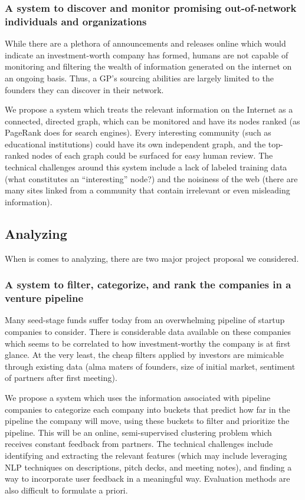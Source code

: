 \subsubsection{A system to discover and monitor promising out-of-network individuals and organizations}

While there are a plethora of announcements and releases online which would indicate an investment-worth company has formed, humans are not capable of monitoring and filtering the wealth of information generated on the internet on an ongoing basis. Thus, a GP's sourcing abilities are largely limited to the founders they can discover in their network.

We propose a system which treats the relevant information on the Internet as a connected, directed graph, which can be monitored and have its nodes ranked (as PageRank does for search engines). Every interesting community (such as educational institutions) could have its own independent graph, and the top-ranked nodes of each graph could be surfaced for easy human review. The technical challenges around this system include a lack of labeled training data (what constitutes an ``interesting'' node?) and the noisiness of the web (there are many sites linked from a community that contain irrelevant or even misleading information).

\subsection{Analyzing}

When is comes to analyzing, there are two major project proposal we considered.

\subsubsection{A system to filter, categorize, and rank the companies in a venture pipeline}

Many seed-stage funds suffer today from an overwhelming pipeline of startup companies to consider. There is considerable data available on these companies which seems to be correlated to how investment-worthy the company is at first glance. At the very least, the cheap filters applied by investors are mimicable through existing data (alma maters of founders, size of initial market, sentiment of partners after first meeting).

We propose a system which uses the information associated with pipeline companies to categorize each company into buckets that predict how far in the pipeline the company will move, using these buckets to filter and prioritize the pipeline. This will be an online, semi-supervised clustering problem which receives constant feedback from partners. The technical challenges include identifying and extracting the relevant features (which may include leveraging NLP techniques on descriptions, pitch decks, and meeting notes), and finding a way to incorporate user feedback in a meaningful way. Evaluation methods are also difficult to formulate a priori.

